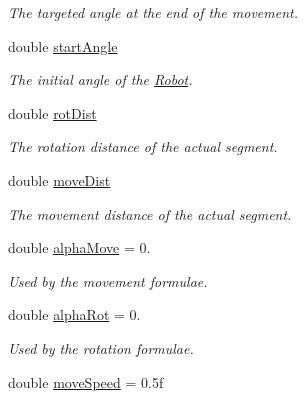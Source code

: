 \begin{DoxyCompactItemize}
\begin{DoxyCompactList}\small\item\em The targeted angle at the end of the movement. \end{DoxyCompactList}\item 
double \hyperlink{classRobot_a6dfebfac8d7ce0da74e9b725b497c525}{start\+Angle}\hypertarget{classRobot_a6dfebfac8d7ce0da74e9b725b497c525}{}\label{classRobot_a6dfebfac8d7ce0da74e9b725b497c525}

\begin{DoxyCompactList}\small\item\em The initial angle of the \hyperlink{classRobot}{Robot}. \end{DoxyCompactList}\item 
double \hyperlink{classRobot_ab79446f46b69d63a3341a4def1e5a043}{rot\+Dist}\hypertarget{classRobot_ab79446f46b69d63a3341a4def1e5a043}{}\label{classRobot_ab79446f46b69d63a3341a4def1e5a043}

\begin{DoxyCompactList}\small\item\em The rotation distance of the actual segment. \end{DoxyCompactList}\item 
double \hyperlink{classRobot_a8f87b634a13863235dd64bdc2ac64eb1}{move\+Dist}\hypertarget{classRobot_a8f87b634a13863235dd64bdc2ac64eb1}{}\label{classRobot_a8f87b634a13863235dd64bdc2ac64eb1}

\begin{DoxyCompactList}\small\item\em The movement distance of the actual segment. \end{DoxyCompactList}\item 
double \hyperlink{classRobot_a4c80046bdc0e2fc0abe63fc8eebb252b}{alpha\+Move} = 0.\hypertarget{classRobot_a4c80046bdc0e2fc0abe63fc8eebb252b}{}\label{classRobot_a4c80046bdc0e2fc0abe63fc8eebb252b}

\begin{DoxyCompactList}\small\item\em Used by the movement formulae. \end{DoxyCompactList}\item 
double \hyperlink{classRobot_ac7f70af1a0589ef3f2964cc1fe17705d}{alpha\+Rot} = 0.\hypertarget{classRobot_ac7f70af1a0589ef3f2964cc1fe17705d}{}\label{classRobot_ac7f70af1a0589ef3f2964cc1fe17705d}

\begin{DoxyCompactList}\small\item\em Used by the rotation formulae. \end{DoxyCompactList}\item 
double \hyperlink{classRobot_a9ffd926d965152cb275765d1abaee1cf}{move\+Speed} = 0.\+5f\hypertarget{classRobot_a9ffd926d965152cb275765d1abaee1cf}{}\label{classRobot_a9ffd926d965152cb275765d1abaee1cf}


\end{DoxyCompactItemize}
